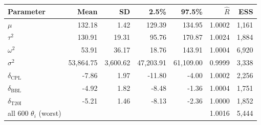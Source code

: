 \begin{tabular}{lrrrrrr}
\toprule
Parameter & Mean & SD & 2.5\% & 97.5\% & $\hat{R}$ & ESS \\
\midrule
$\mu$ & 132.18 & 1.42 & 129.39 & 134.95 & 1.0002 & 1,161 \\
$\tau^2$ & 130.91 & 19.31 & 95.76 & 170.87 & 1.0024 & 1,884 \\
$\omega^2$ & 53.91 & 36.17 & 18.76 & 143.91 & 1.0004 & 6,920 \\
$\sigma^2$ & 53,864.75 & 3,600.62 & 47,203.91 & 61,109.00 & 0.9999 & 3,338 \\
$\delta_{\mathrm{CPL}}$ & -7.86 & 1.97 & -11.80 & -4.00 & 1.0002 & 2,256 \\
$\delta_{\mathrm{BBL}}$ & -4.92 & 1.82 & -8.48 & -1.36 & 1.0004 & 1,751 \\
$\delta_{\mathrm{T20I}}$ & -5.21 & 1.46 & -8.13 & -2.36 & 1.0000 & 1,852 \\
\midrule
all 600 $\theta_i$ (worst) & \multicolumn{4}{l}{} & 1.0016 & 5,444 \\
\bottomrule
\end{tabular}